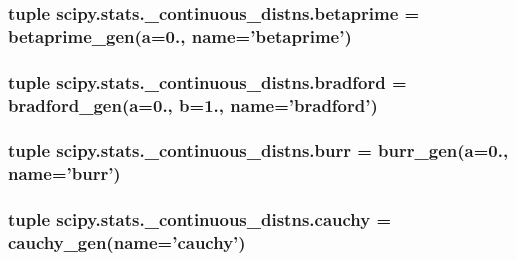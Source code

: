 \subsubsection[{betaprime}]{\setlength{\rightskip}{0pt plus 5cm}tuple scipy.\+stats.\+\_\+continuous\+\_\+distns.\+betaprime = {\bf betaprime\+\_\+gen}({\bf a}=0., name='betaprime')}\label{namespacescipy_1_1stats_1_1__continuous__distns_a4189f178cec3858fe5598b02e9e37331}
\hypertarget{namespacescipy_1_1stats_1_1__continuous__distns_a8aa0f721d484927ad278441d32ac145c}{}
\subsubsection[{bradford}]{\setlength{\rightskip}{0pt plus 5cm}tuple scipy.\+stats.\+\_\+continuous\+\_\+distns.\+bradford = {\bf bradford\+\_\+gen}({\bf a}=0., {\bf b}=1., name='bradford')}\label{namespacescipy_1_1stats_1_1__continuous__distns_a8aa0f721d484927ad278441d32ac145c}
\hypertarget{namespacescipy_1_1stats_1_1__continuous__distns_a10428435941707f63f41ed69be6805de}{}
\subsubsection[{burr}]{\setlength{\rightskip}{0pt plus 5cm}tuple scipy.\+stats.\+\_\+continuous\+\_\+distns.\+burr = {\bf burr\+\_\+gen}({\bf a}=0., name='burr')}\label{namespacescipy_1_1stats_1_1__continuous__distns_a10428435941707f63f41ed69be6805de}
\hypertarget{namespacescipy_1_1stats_1_1__continuous__distns_ab2665179e5018acee29a0001c6b3f8bf}{}
\subsubsection[{cauchy}]{\setlength{\rightskip}{0pt plus 5cm}tuple scipy.\+stats.\+\_\+continuous\+\_\+distns.\+cauchy = {\bf cauchy\+\_\+gen}(name='cauchy')}\label{namespacescipy_1_1stats_1_1__continuous__distns_ab2665179e5018acee29a0001c6b3f8bf}
\hypertarget{namespacescipy_1_1stats_1_1__continuous__distns_ad66cbb89f848c88a19fc3fc9dbfcf831}{}
